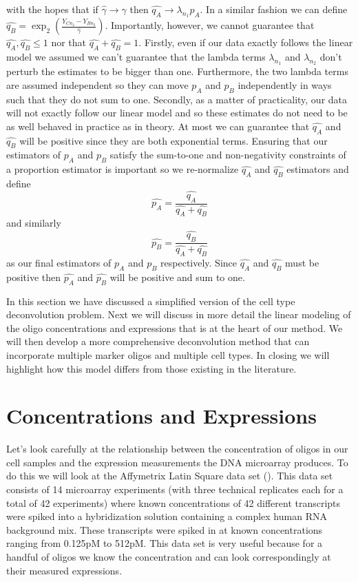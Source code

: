 \documentclass[reqno,12pt,oneside]{report}\usepackage[]{graphicx}\usepackage[]{color}
\theoremstyle{plain}
\theoremstyle{definition}
\theoremstyle{remark}
\numberwithin{theorem}{chapter}     %
\begin{document}
with the hopes that if $\widehat{\gamma}\rightarrow\gamma$ then $\widehat{q_A}\rightarrow \lambda_{n_1} p_A$. In a similar fashion we can define $\widehat{q_B} = \exp_2\left(\frac{Y_{Cn_2}-Y_{Bn_2}}{\widehat{\gamma}}\right)$. Importantly, however, we cannot guarantee that $\widehat{q_A},\widehat{q_B}\leq 1$ nor that $\widehat{q_A}+\widehat{q_B} = 1$. Firstly, even if our data exactly follows the linear model we assumed we can't guarantee that the lambda terms $\lambda_{n_1}$ and $\lambda_{n_2}$ don't perturb the estimates to be bigger than one. Furthermore, the two lambda terms are assumed independent so they can move $p_A$ and $p_B$ independently in ways such that they do not sum to one. Secondly, as a matter of practicality, our data will not exactly follow our linear model and so these estimates do not need to be as well behaved in practice as in theory. At most we can guarantee that $\widehat{q_A}$ and $\widehat{q_B}$ will be positive since they are both exponential terms. Ensuring that our estimators of $p_A$ and $p_B$ satisfy the sum-to-one and non-negativity constraints of a proportion estimator is important so we re-normalize $\widehat{q_A}$ and $\widehat{q_B}$ estimators and define
\[
\widehat{p_A} = \frac{\widehat{q_A}}{\widehat{q_A}+\widehat{q_B}}
\]
and similarly 
\[
\widehat{p_B} = \frac{\widehat{q_B}}{\widehat{q_A}+\widehat{q_B}}
\]
as our final estimators of $p_A$ and $p_B$ respectively. Since $\widehat{q_A}$ and $\widehat{q_B}$ must be positive then $\widehat{p_A}$ and $\widehat{p_B}$ will be positive and sum to one. 

In this section we have discussed a simplified version of the cell type deconvolution problem. Next we will discuss in more detail the linear modeling of the oligo concentrations and expressions that is at the heart of our method. We will then develop a more comprehensive deconvolution method that can incorporate multiple marker oligos and multiple cell types. In closing we will highlight how this model differs from those existing in the literature.

\section{Concentrations and Expressions}

Let's look carefully at the relationship between the concentration of oligos in our cell samples and the expression measurements the DNA microarray produces. To do this we will look at the Affymetrix Latin Square data set (\cite{latin}). This data set consists of 14 microarray experiments (with three technical replicates each for a total of 42 experiments) where known concentrations of 42 different transcripts were spiked into a hybridization solution containing a complex human RNA background mix. These transcripts were spiked in at known concentrations ranging from 0.125pM to 512pM. This data set is very useful because for a handful of oligos we know the concentration and can look correspondingly at their measured expressions.
\end{document}
